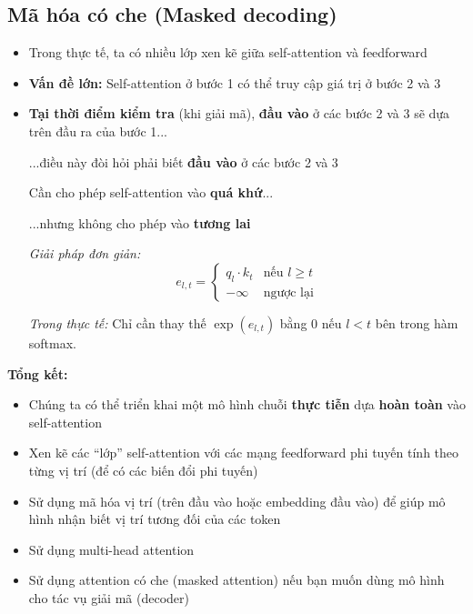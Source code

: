 \documentclass{book}
\begin{document}
    \subsection{Mã hóa có che (Masked decoding)}
    \begin{itemize}
        \item Trong thực tế, ta có nhiều lớp xen kẽ giữa self-attention và feedforward
        \item \textbf{Vấn đề lớn:} Self-attention ở bước 1 có thể truy cập giá trị ở bước 2 và 3
        \item \textbf{Tại thời điểm kiểm tra} (khi giải mã), \textbf{đầu vào} ở các bước 2 và 3 sẽ dựa trên đầu ra của bước 1...

        ...điều này đòi hỏi phải biết \textbf{đầu vào} ở các bước 2 và 3
        
        Cần cho phép self-attention vào \textbf{quá khứ}...
        
        ...nhưng không cho phép vào \textbf{tương lai}
        
        \textit{Giải pháp đơn giản:}
        \[
        e_{l,t} = 
        \begin{cases}
            q_l \cdot k_t & \text{nếu } l \geq t \\
            -\infty & \text{ngược lại}
        \end{cases}
        \]
        
        \textit{Trong thực tế:}
        Chỉ cần thay thế $\exp(e_{l,t})$ bằng 0 nếu $l < t$ bên trong hàm softmax.
    \end{itemize}
\textbf{Tổng kết:}
\begin{itemize}
    \item Chúng ta có thể triển khai một mô hình chuỗi \textbf{thực tiễn} dựa \textbf{hoàn toàn} vào self-attention
    \item Xen kẽ các “lớp” self-attention với các mạng feedforward phi tuyến tính theo từng vị trí (để có các biến đổi phi tuyến)
    \item Sử dụng mã hóa vị trí (trên đầu vào hoặc embedding đầu vào) để giúp mô hình nhận biết vị trí tương đối của các token
    \item Sử dụng multi-head attention
    \item Sử dụng attention có che (masked attention) nếu bạn muốn dùng mô hình cho tác vụ giải mã (decoder)
\end{itemize}
\end{document}
